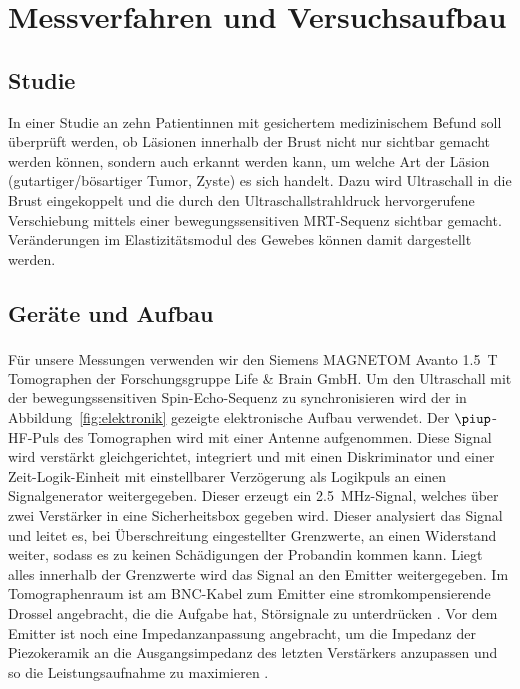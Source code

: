 \documentclass[
    11pt,
    ngerman
]{scrreprt}
\begin{document}
\chapter{Messverfahren und Versuchsaufbau}

\section{Studie}

In einer Studie an zehn Patientinnen mit gesichertem medizinischem Befund soll
überprüft werden, ob Läsionen innerhalb der Brust nicht nur sichtbar gemacht
werden können, sondern auch erkannt werden kann, um welche Art der Läsion
(gutartiger/bösartiger Tumor, Zyste) es sich handelt. Dazu wird Ultraschall in
die Brust eingekoppelt und die durch den Ultraschallstrahldruck hervorgerufene
Verschiebung mittels einer bewegungssensitiven MRT-Sequenz sichtbar gemacht.
Veränderungen im Elastizitätsmodul des Gewebes können damit dargestellt werden.

\section{Geräte und Aufbau}

Für unsere Messungen verwenden wir den Siemens
\textsc{MAGNETOM}\textsuperscript{\textregistered} Avanto \SI{1.5}{\tesla}
Tomographen der Forschungsgruppe Life \& Brain GmbH. Um den Ultraschall mit der
bewegungssensitiven Spin-Echo-Sequenz zu synchronisieren wird der in
Abbildung~\ref{fig:elektronik} gezeigte elektronische Aufbau verwendet. Der
$\piup$-HF-Puls des Tomographen wird mit einer Antenne aufgenommen. Diese
Signal wird verstärkt gleichgerichtet, integriert und mit einen Diskriminator
und einer Zeit-Logik-Einheit mit einstellbarer Verzögerung als Logikpuls an
einen Signalgenerator weitergegeben. Dieser erzeugt ein
\SI{2.5}{\mega\hertz}-Signal, welches über zwei Verstärker in eine
Sicherheitsbox gegeben wird. Dieser analysiert das Signal und leitet es, bei
Überschreitung eingestellter Grenzwerte, an einen Widerstand weiter, sodass es
zu keinen Schädigungen der Probandin kommen kann. Liegt alles innerhalb der
Grenzwerte wird das Signal an den Emitter weitergegeben. Im Tomographenraum ist
am BNC-Kabel zum Emitter eine stromkompensierende Drossel angebracht, die die
Aufgabe hat, Störsignale zu unterdrücken \parencite{diss_radicke}. Vor dem
Emitter ist noch eine Impedanzanpassung angebracht, um die Impedanz der
Piezokeramik an die Ausgangsimpedanz des letzten Verstärkers anzupassen und so
die Leistungsaufnahme zu maximieren \parencite{dipl_kofahl}.
\end{document}
